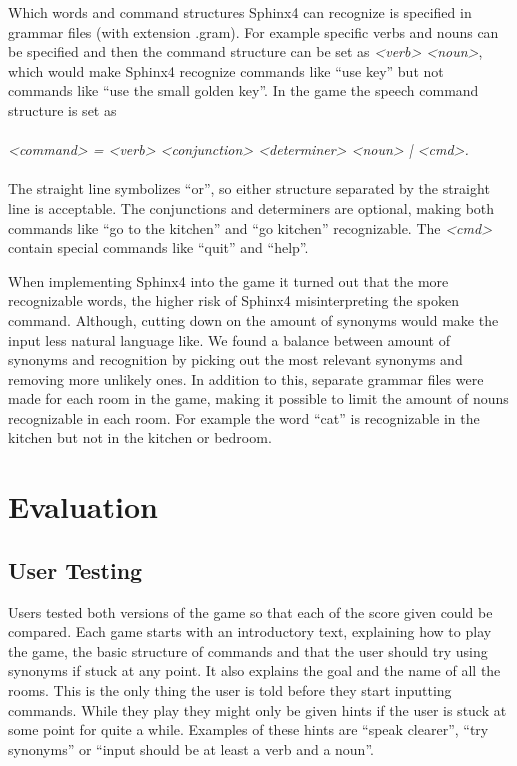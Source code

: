 Which words and command structures Sphinx4 can recognize is specified in grammar files (with extension .gram). For example specific verbs and nouns can be specified and then the command structure can be set as \textit{<verb> <noun>}, which would make Sphinx4 recognize commands like ``use key'' but not commands like ``use the small golden key''. In the game the speech command structure is set as
\\
\\
\textit{<command> = <verb> <conjunction> <determiner> <noun> | <cmd>.}
\\
\\
The straight line symbolizes ``or'', so either structure separated by the straight line is acceptable. The conjunctions and determiners are optional, making both commands like ``go to the kitchen'' and ``go kitchen'' recognizable. The \textit{<cmd>} contain special commands like ``quit'' and ``help''.

When implementing Sphinx4 into the game it turned out that the more recognizable words, the higher risk of Sphinx4 misinterpreting the spoken command. Although, cutting down on the amount of synonyms would make the input less natural language like. We found a balance between amount of synonyms and recognition by picking out the most relevant synonyms and removing more unlikely ones. In addition to this, separate grammar files were made for each room in the game, making it possible to limit the amount of nouns recognizable in each room. For example the word ``cat'' is recognizable in the kitchen but not in the kitchen or bedroom.

\section{Evaluation}
\subsection{User Testing}
Users tested both versions of the game so that each of the score given could be compared. Each game starts with an introductory text, explaining how to play the game, the basic structure of commands and that the user should try using synonyms if stuck at any point. It also explains the goal and the name of all the rooms. This is the only thing the user is told before they start inputting commands. While they play they might only be given hints if the user is stuck at some point for quite a while. Examples of these hints are ``speak clearer'', ``try synonyms'' or ``input should be at least a verb and a noun''.

